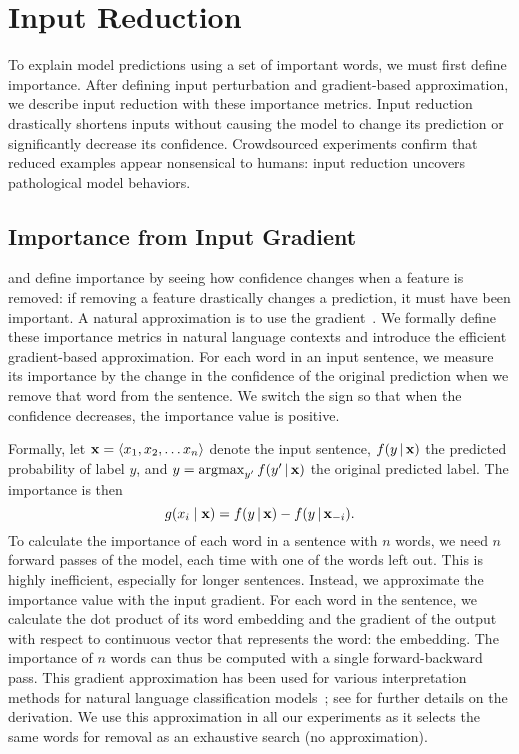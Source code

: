 \section{Input Reduction}
\label{sec:method}

To explain model predictions using a set of important words, we must first
define importance. After defining input perturbation and gradient-based
approximation, we describe input reduction with these importance
metrics. Input reduction 
drastically shortens inputs without causing the model to change its
prediction or significantly decrease its confidence.
Crowdsourced experiments confirm that
reduced examples appear nonsensical to humans: input reduction uncovers
pathological model behaviors.

\subsection{Importance from Input Gradient} 

\citet{ribeiro2016lime} and \citet{li2016understanding} define importance by
seeing how confidence changes when a feature is removed: if removing a feature drastically changes a prediction, it must have been important.  A natural
approximation is to use the gradient~\cite{baehrens2010explain,
simonyan2013deep}.  We formally define these importance metrics in natural
language contexts and introduce the efficient gradient-based approximation.
For each word
in an input sentence, we measure its importance by the change in the
confidence of the original prediction when we remove that word from the sentence.
We switch the sign so that when the confidence decreases, the importance
value is positive.

Formally,
let $\boldsymbol{\mathbf{x}}=\langle x_1, x_2, \ldots x_n \rangle$ denote the input sentence,
$f(y \, | \, \boldsymbol{\mathbf{x}})$ the predicted probability of label $y$, and 
$y=\operatorname*{\arg\!\max}_{y'} f(y' \, | \, \boldsymbol{\mathbf{x}})$ the original predicted label. The importance is
then
\begin{equation} \label{eq:importance}
    g(x_i\mid \boldsymbol{\mathbf{x}}) = f(y \, | \, \boldsymbol{\mathbf{x}}) - f(y \, | \, \boldsymbol{\mathbf{x}}_{-i}).
\end{equation}
To calculate the importance of each word in a sentence with $n$ words,
we need $n$ forward passes of the model, each time with
one of the words left out.  This is highly inefficient, especially for
longer sentences. Instead, we approximate the importance value with the input
gradient. For each word in the sentence, we calculate the dot product of its
word embedding and the gradient of the output with respect to continuous vector that represents the word: the embedding. The
importance of $n$ words can thus be computed with a single forward-backward
pass. This gradient approximation has been used for various interpretation
methods for natural language classification models~\cite{li2016visualizing,
arras2016explaining}; see \citet{ebrahimi2017hotflip} for further details on the
derivation. We use this approximation in all our experiments as it selects the
same words for removal as an exhaustive search (no approximation). 



